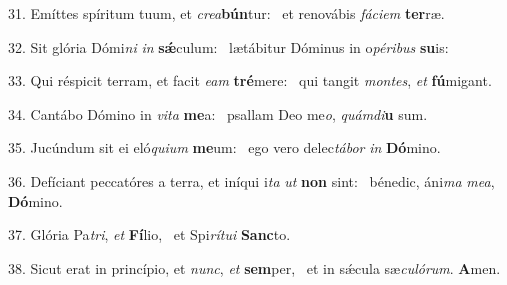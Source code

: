 31. Emíttes spíritum tuum, et \textit{cre}\textit{a}\textbf{bún}tur: \ast\  et renovábis \textit{fá}\textit{ci}\textit{em} \textbf{ter}ræ.\

32. Sit glória Dómi\textit{ni} \textit{in} \textbf{sǽ}culum: \ast\  lætábitur Dóminus in o\textit{pé}\textit{ri}\textit{bus} \textbf{su}is:\

33. Qui réspicit terram, et facit \textit{e}\textit{am} \textbf{tré}mere: \ast\  qui tangit \textit{mon}\textit{tes}, \textit{et} \textbf{fú}migant.\

34. Cantábo Dómino in \textit{vi}\textit{ta} \textbf{me}a: \ast\  psallam Deo me\textit{o}, \textit{quám}\textit{di}\textbf{u} sum.\

35. Jucúndum sit ei eló\textit{qui}\textit{um} \textbf{me}um: \ast\  ego vero delec\textit{tá}\textit{bor} \textit{in} \textbf{Dó}mino.\

36. Defíciant peccatóres a terra, et iníqui i\textit{ta} \textit{ut} \textbf{non} sint: \ast\  bénedic, áni\textit{ma} \textit{me}\textit{a}, \textbf{Dó}mino.\

37. Glória Pa\textit{tri}, \textit{et} \textbf{Fí}lio, \ast\  et Spi\textit{rí}\textit{tu}\textit{i} \textbf{Sanc}to.\

38. Sicut erat in princípio, et \textit{nunc}, \textit{et} \textbf{sem}per, \ast\  et in sǽcula sæ\textit{cu}\textit{ló}\textit{rum}. \textbf{A}men.\

